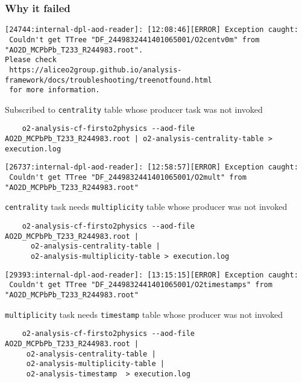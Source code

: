 \documentclass[14pt,aspectratio=169,t]{beamer}
\begin{document}
\begin{frame}[fragile]
  \frametitle{Why it failed}
  \small
  {\tiny\color{red}
  \vspace{-0.2in}
  \begin{verbatim}
[24744:internal-dpl-aod-reader]: [12:08:46][ERROR] Exception caught: 
 Couldn't get TTree "DF_2449832441401065001/O2centv0m" from "AO2D_MCPbPb_T233_R244983.root". 
Please check 
 https://aliceo2group.github.io/analysis-framework/docs/troubleshooting/treenotfound.html 
 for more information. 
  \end{verbatim}}
  \vspace{-0.2in}
  Subscribed to \texttt{centrality} table whose producer task was not invoked
  {\tiny\color{black}
  \vspace{-0.1in}
  \begin{verbatim}
    o2-analysis-cf-firsto2physics --aod-file AO2D_MCPbPb_T233_R244983.root | o2-analysis-centrality-table > execution.log
  \end{verbatim}}
  {\tiny\color{red}
  \vspace{-0.4in}
  \begin{verbatim}
[26737:internal-dpl-aod-reader]: [12:58:57][ERROR] Exception caught: 
 Couldn't get TTree "DF_2449832441401065001/O2mult" from "AO2D_MCPbPb_T233_R244983.root"
  \end{verbatim}}
  \vspace{-0.2in}
  \texttt{centrality} task needs \texttt{multiplicity} table whose producer was not invoked
  {\tiny\color{black}
  \vspace{-0.1in}
  \begin{verbatim}
    o2-analysis-cf-firsto2physics --aod-file AO2D_MCPbPb_T233_R244983.root |  
      o2-analysis-centrality-table | 
      o2-analysis-multiplicity-table > execution.log
  \end{verbatim}}
  {\tiny\color{red}
  \vspace{-0.4in}
  \begin{verbatim}
[29393:internal-dpl-aod-reader]: [13:15:15][ERROR] Exception caught: 
 Couldn't get TTree "DF_2449832441401065001/O2timestamps" from "AO2D_MCPbPb_T233_R244983.root"
  \end{verbatim}}
  \vspace{-0.2in}
  \texttt{multiplicity} task needs \texttt{timestamp} table whose producer was not invoked
  {\tiny\color{black}
  \vspace{-0.1in}
  \begin{verbatim}
    o2-analysis-cf-firsto2physics --aod-file AO2D_MCPbPb_T233_R244983.root |  
     o2-analysis-centrality-table | 
     o2-analysis-multiplicity-table | 
     o2-analysis-timestamp  > execution.log
  \end{verbatim}}
\end{frame}
\end{document}
